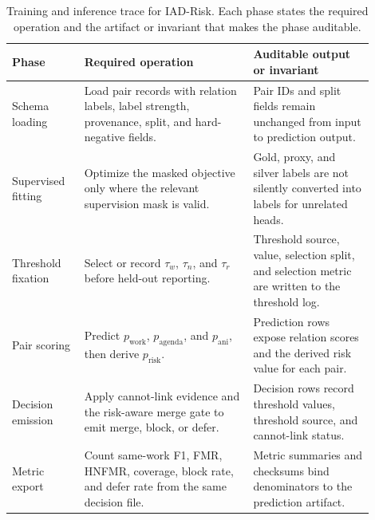 \documentclass[11pt]{article}
\begin{document}
\begin{table}[H]
\caption{Training and inference trace for IAD-Risk. Each phase states the required operation and the artifact or invariant that makes the phase auditable.}
\label{tab:training-inference-trace}
\centering
\footnotesize
\setlength{\tabcolsep}{3pt}
\begin{tabular}{L{0.18\linewidth}L{0.42\linewidth}L{0.30\linewidth}}
\toprule
Phase & Required operation & Auditable output or invariant \\
\midrule
Schema loading & Load pair records with relation labels, label strength, provenance, split, and hard-negative fields. & Pair IDs and split fields remain unchanged from input to prediction output. \\
Supervised fitting & Optimize the masked objective only where the relevant supervision mask is valid. & Gold, proxy, and silver labels are not silently converted into labels for unrelated heads. \\
Threshold fixation & Select or record $\tau_w$, $\tau_n$, and $\tau_r$ before held-out reporting. & Threshold source, value, selection split, and selection metric are written to the threshold log. \\
Pair scoring & Predict $p_{\mathrm{work}}$, $p_{\mathrm{agenda}}$, and $p_{\mathrm{ani}}$, then derive $p_{\mathrm{risk}}$. & Prediction rows expose relation scores and the derived risk value for each pair. \\
Decision emission & Apply cannot-link evidence and the risk-aware merge gate to emit merge, block, or defer. & Decision rows record threshold values, threshold source, and cannot-link status. \\
Metric export & Count same-work F1, FMR, HNFMR, coverage, block rate, and defer rate from the same decision file. & Metric summaries and checksums bind denominators to the prediction artifact. \\
\bottomrule
\end{tabular}
\end{table}
\end{document}
